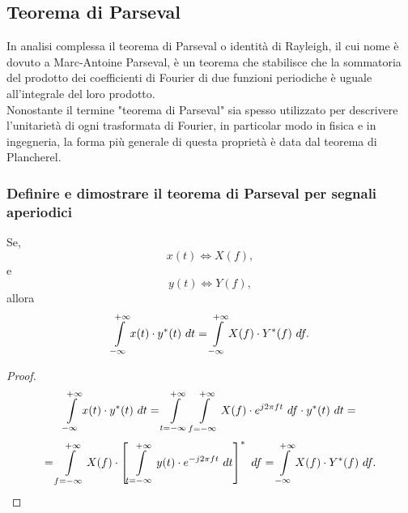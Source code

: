 \documentclass[12pt,oneside,openany]{memoir}
\numberwithin{equation}{subsection}
\newcommand{\dt}{\ dt}
\newcommand{\df}{\ df}
\begin{document}
\newpage
\subsection{Teorema di Parseval}
In analisi complessa il teorema di Parseval o identit\`a di Rayleigh, il cui 
nome \`e dovuto a Marc-Antoine Parseval, \`e un teorema che stabilisce che la 
sommatoria del prodotto dei coefficienti di Fourier di due funzioni periodiche 
\`e uguale all'integrale del loro prodotto.\\
Nonostante il termine "teorema di Parseval" sia spesso utilizzato per descrivere
l'unitariet\`a di ogni trasformata di Fourier, in particolar modo in fisica e in
ingegneria, la forma pi\`u generale di questa propriet\`a \`e data dal teorema
di Plancherel.


\subsubsection{Definire e dimostrare il teorema di Parseval per segnali
aperiodici}
Se,
\[
    x(t) \iff X(f),
\]
e
\[
    y(t) \iff Y(f),
\]
allora
\[
    \int\displaylimits_{-\infty}^{+\infty} x(t) \cdot y^*(t) \dt =
    \int\displaylimits_{-\infty}^{+\infty} X(f) \cdot Y^*(f) \df.
\]
\begin{proof}
\[
    \int\displaylimits_{-\infty}^{+\infty} x(t) \cdot y^*(t) \dt =
    \int\displaylimits_{t = -\infty}^{+\infty}
    \int\displaylimits_{f = -\infty}^{+\infty} X(f) \cdot e^{j 2 \pi f t}
    \df \cdot y^*(t) \dt =
\]
\[
    = \int\displaylimits_{f = -\infty}^{+\infty} X(f) \cdot \left[
        \int\displaylimits_{t = -\infty}^{+\infty} y(t) \cdot e^{-j 2 \pi f t}
        \dt
    \right]^* \df = \int\displaylimits_{-\infty}^{+\infty} X(f) \cdot Y^*(f) \df
    .
\]
\end{proof}

\end{document}
